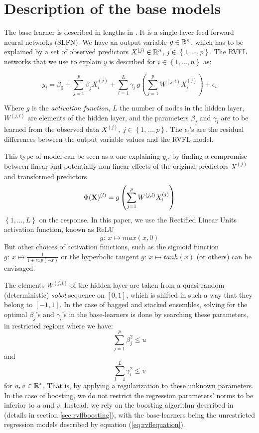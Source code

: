 \section{Description of the base models}
\label{sec:basemodeldesc}

The base learner is described in lengths in \cite{moudiki2018multiple}. It is a single layer feed forward neural networks (SLFN). We have an output variable $y \in \mathbb{R}^n$, which has to be explained by a set of observed predictors $X^{(j)} \in \mathbb{R}^n$, $j \in \left\lbrace 1, \ldots,
p\right\rbrace$. The RVFL networks that we use to explain $y$ is described for $i \in \left\lbrace 1, \ldots, n\right\rbrace$ as:

\begin{equation}
\label{eq:rvflequation}
y_i = \beta_0 + \sum_{j = 1}^p \beta_j X_i^{(j)} + \sum_{l = 1}^L \gamma_l \:
g\left(\sum_{j = 1}^p W^{(j, l)} X_i^{(j)}\right) + \epsilon_i
\end{equation}

\medskip

Where $g$ is the \textit{activation function}, $L$ the number of nodes in the hidden
layer, $W^{(j, l)}$ are elements of the hidden layer, and the parameters
$\beta_j$ and $\gamma_l$ are to be learned from the observed data $X^{(j)}, \: j
\in \left\lbrace 1, \ldots, p\right\rbrace$. The $\epsilon_i$'s are the residual
differences between the output variable values and the RVFL model.

\medskip

This type of model can be seen as a one explaining $y_i$, by finding a
compromise between linear and potentially non-linear effects of the original
predictors $X^{(j)}$ and transformed predictors
$$
\Phi({\bf X})^{(l)}= g\left(\sum_{j = 1}^p W^{(j, l)} X_i^{(j)}\right)
$$
$\left \lbrace 1, \ldots, L\right\rbrace$ on the response. In this paper, we use the Rectified Linear Units activation function, known as ReLU
$$
g: \: x \mapsto max(x, 0)
$$
But other choices of activation functions, such as the sigmoid function $g: \: x \mapsto \frac{1}{1+exp(-x)}$ or the hyperbolic tangent $g: \: x \mapsto tanh(x)$ (or others) can be envisaged.

\medskip

The elements $W^{(j, l)}$ of the hidden layer are taken from a quasi-random (deterministic) \textit{sobol} sequence on $[0, 1]$, which is shifted in such a way that they belong to $[-1, 1]$. In the case of bagged and stacked ensembles, solving for the optimal $\beta_j$'s and $\gamma_l$'s in the base-learners is done by searching these parameters,  in restricted regions where we have:
$$
\sum_{j=1}^p \beta_j^2  \leq u
$$
and
$$
\sum_{l=1}^L
\gamma_l^2 \leq v
$$ for $u, v \in \mathbb{R}^*$. That is, by applying a regularization to these unknown parameters. In the case of boosting, we do not restrict the regression parameters' norms to be inferior to $u$ and $v$. Instead, we rely on the boosting algorithm described in \cite{hothorn2010model} (details in section \ref{sec:rvflboosting}), with the base-learners being the unrestricted regression models described by equation (\ref{eq:rvflequation}). 



